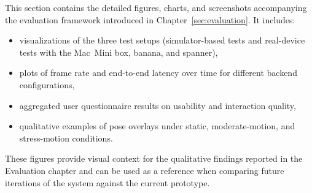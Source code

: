 This section contains the detailed figures, charts, and screenshots accompanying the evaluation framework introduced in Chapter~\ref{sec:evaluation}. It includes:
\begin{itemize}
    \item visualizations of the three test setups (simulator-based tests and real-device tests with the Mac~Mini box, banana, and spanner),
    \item plots of frame rate and end-to-end latency over time for different backend configurations,
    \item aggregated user questionnaire results on usability and interaction quality,
    \item qualitative examples of pose overlays under static, moderate-motion, and stress-motion conditions.
\end{itemize}

These figures provide visual context for the qualitative findings reported in the Evaluation chapter and can be used as a reference when comparing future iterations of the system against the current prototype.
